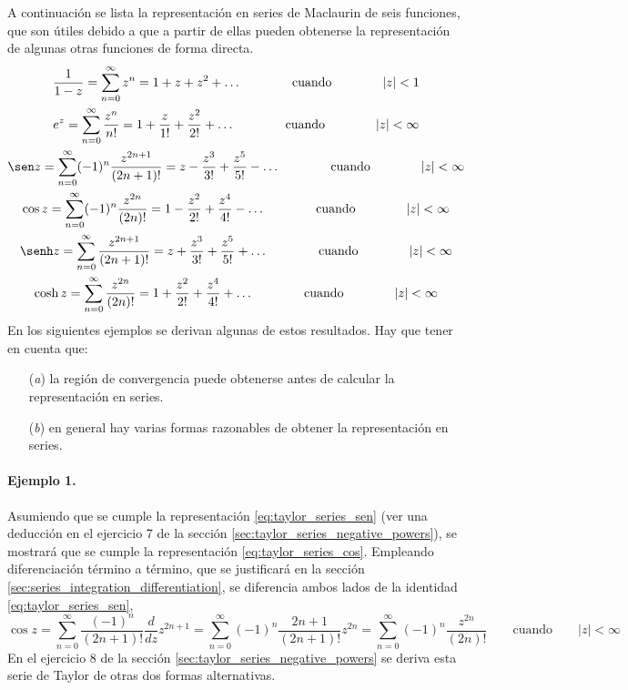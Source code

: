 \documentclass[a4paper]{report}
\begin{document}
A continuación se lista la representación en series de Maclaurin de seis funciones, que son útiles debido a que a partir de ellas pueden obtenerse la representación de algunas otras funciones de forma directa.
\begin{gather}
 \frac{1}{1-z}=\sum_{n=0}^\infty z^n=1+z+z^2+\dots
 \qquad\qquad\textrm{cuando}\qquad\qquad
 |z|<1\label{eq:taylor_series_geometric}\\
 e^z=\sum_{n=0}^\infty\frac{z^n}{n!}=1+\frac{z}{1!}+\frac{z^2}{2!}+\dots
 \qquad\qquad\textrm{cuando}\qquad\qquad
 |z|<\infty\label{eq:taylor_series_exponential}\\
 \sen z=\sum_{n=0}^\infty(-1)^n\frac{z^{2n+1}}{(2n+1)!}=z-\frac{z^3}{3!}+\frac{z^5}{5!}-\dots
 \qquad\qquad\textrm{cuando}\qquad\qquad
 |z|<\infty\label{eq:taylor_series_sen}\\
 \cos z=\sum_{n=0}^\infty(-1)^n\frac{z^{2n}}{(2n)!}=1-\frac{z^2}{2!}+\frac{z^4}{4!}-\dots
 \qquad\qquad\textrm{cuando}\qquad\qquad
 |z|<\infty\label{eq:taylor_series_cos}\\
  \senh z=\sum_{n=0}^\infty\frac{z^{2n+1}}{(2n+1)!}=z+\frac{z^3}{3!}+\frac{z^5}{5!}+\dots
 \qquad\qquad\textrm{cuando}\qquad\qquad
 |z|<\infty\label{eq:taylor_series_senh}\\
 \cosh z=\sum_{n=0}^\infty\frac{z^{2n}}{(2n)!}=1+\frac{z^2}{2!}+\frac{z^4}{4!}+\dots
 \qquad\qquad\textrm{cuando}\qquad\qquad
 |z|<\infty\label{eq:taylor_series_cosh}
\end{gather}
En los siguientes ejemplos se derivan algunas de estos resultados. Hay que tener en cuenta que:
\begin{enumerate}
 \item[(\textit{a})] la región de convergencia puede obtenerse antes de calcular la representación en series.
 \item[(\textit{b})] en general hay varias formas razonables de obtener la representación en series.
\end{enumerate}

\paragraph{Ejemplo 1.} Asumiendo que se cumple la representación \ref{eq:taylor_series_sen} (ver una deducción en el ejercicio 7 de la sección \ref{sec:taylor_series_negative_powers}), se mostrará que se cumple la representación \ref{eq:taylor_series_cos}. Empleando diferenciación término a término, que se justificará en la sección \ref{sec:series_integration_differentiation}, se diferencia ambos lados de la identidad \ref{eq:taylor_series_sen},
\[
 \cos z=\sum_{n=0}^\infty\frac{(-1)^n}{(2n+1)!}\frac{d}{dz}z^{2n+1}
  =\sum_{n=0}^\infty(-1)^n\frac{2n+1}{(2n+1)!}z^{2n}
  =\sum_{n=0}^\infty(-1)^n\frac{z^{2n}}{(2n)!}
 \qquad\textrm{cuando}\qquad
 |z|<\infty
\]
En el ejercicio 8 de la sección \ref{sec:taylor_series_negative_powers} se deriva esta serie de Taylor de otras dos formas alternativas.
\end{document}

